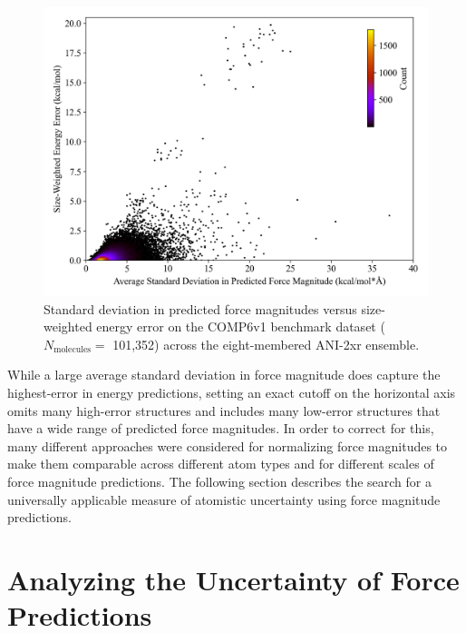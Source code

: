 \begin{figure}[H]
    \centering
    \includegraphics[width=1\linewidth]{Images/2xr_forces/force_stdev-vs-energy_error.png}
    \caption[2D Histogram of standard deviation in predicted force magnitudes versus energy error (COMP6v1)]{Standard deviation in predicted force magnitudes versus size-weighted energy error on the COMP6v1 benchmark dataset  ($N_\text{molecules}=$ 101,352) across the eight-membered ANI-2xr ensemble.}
    \label{fig:2xr_comp6v1-forces-stdev-vs-energy-error}
\end{figure}

While a large average standard deviation in force magnitude does capture the highest-error in energy predictions, setting an exact cutoff on the horizontal axis omits many high-error structures and includes many low-error structures that have a wide range of predicted force magnitudes.
In order to correct for this, many different approaches were considered for normalizing force magnitudes to make them comparable across different atom types and for different scales of force magnitude predictions. 
The following section describes the search for a universally applicable measure of atomistic uncertainty using force magnitude predictions.

\section{Analyzing the Uncertainty of Force Predictions}
\label{sec:analyzing_force_uncertainty}

